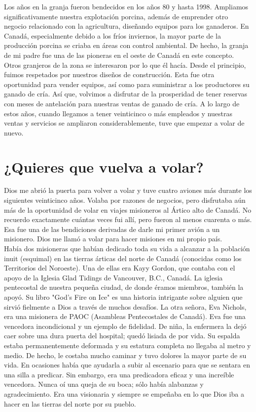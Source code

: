 \documentclass[twoside, 12pt]{book}
\begin{document}
Los años en la granja fueron bendecidos en los años 80 y hasta 1998. Ampliamos significativamente nuestra explotación porcina, además de emprender otro negocio relacionado con la agricultura, diseñando equipos para los ganaderos. En Canadá, especialmente debido a los fríos inviernos, la mayor parte de la producción porcina se criaba en áreas con control ambiental. De hecho, la granja de mi padre fue una de las pioneras en el oeste de Canadá en este concepto. Otros granjeros de la zona se interesaron por lo que él hacía. Desde el principio, fuimos respetados por nuestros diseños de construcción. Esta fue otra oportunidad para vender equipos, así como para suministrar a los productores su ganado de cría. Así que, volvimos a disfrutar de la prosperidad de tener reservas con meses de antelación para nuestras ventas de ganado de cría. A lo largo de estos años, cuando llegamos a tener veinticinco o más empleados y nuestras ventas y servicios se ampliaron considerablemente, tuve que empezar a volar de nuevo.\\

\section{¿Quieres que vuelva a volar?}

Dios me abrió la puerta para volver a volar y tuve cuatro aviones más durante los siguientes veinticinco años. Volaba por razones de negocios, pero disfrutaba aún más de la oportunidad de volar en viajes misioneros al Ártico alto de Canadá. No recuerdo exactamente cuántas veces fui allí, pero fueron al menos cuarenta o más. Esa fue una de las bendiciones derivadas de darle mi primer avión a un misionero. Dios me llamó a volar para hacer misiones en mi propio país.\\

Había dos misioneras que habían dedicado toda su vida a alcanzar a la población inuit (esquimal) en las tierras árticas del norte de Canadá (conocidas como los Territorios del Noroeste). Una de ellas era Kayy Gordon, que contaba con el apoyo de la Iglesia Glad Tidings de Vancouver, B.C., Canadá. La iglesia pentecostal de nuestra pequeña ciudad, de donde éramos miembros, también la apoyó. Su libro "God's Fire on Ice" es una historia intrigante sobre alguien que sirvió fielmente a Dios a través de muchos desafíos. La otra señora, Eva Nichols, era una misionera de PAOC (Asambleas Pentecostales de Canadá). Eva fue una vencedora incondicional y un ejemplo de fidelidad. De niña, la enfermera la dejó caer sobre una dura puerta del hospital; quedó lisiada de por vida. Su espalda estaba permanentemente deformada y su estatura completa no llegaba al metro y medio. De hecho, le costaba mucho caminar y tuvo dolores la mayor parte de su vida. En ocasiones había que ayudarla a subir al escenario para que se sentara en una silla a predicar. Sin embargo, era una predicadora eficaz y una increíble vencedora. Nunca oí una queja de su boca; sólo había alabanzas y agradecimiento. Era una visionaria y siempre se empeñaba en lo que Dios iba a hacer en las tierras del norte por su pueblo.\\
\end{document}

